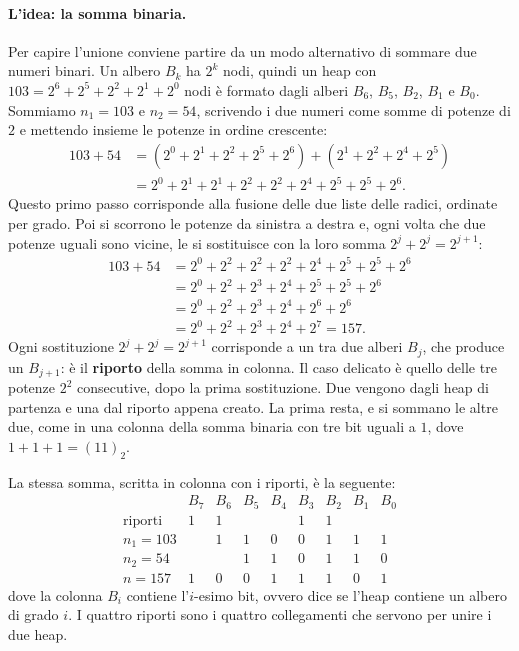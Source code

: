 \paragraph{L'idea: la somma binaria.}
Per capire l'unione conviene partire da un modo alternativo di sommare due numeri binari. Un albero $B_k$ ha $2^k$ nodi, quindi un heap con $103 = 2^6 + 2^5 + 2^2 + 2^1 + 2^0$ nodi è formato dagli alberi $B_6$, $B_5$, $B_2$, $B_1$ e $B_0$. Sommiamo $n_1 = 103$ e $n_2 = 54$, scrivendo i due numeri come somme di potenze di $2$ e mettendo insieme le potenze in ordine crescente:
\[
\begin{aligned}
103 + 54 &= (2^0 + 2^1 + 2^2 + 2^5 + 2^6) + (2^1 + 2^2 + 2^4 + 2^5) \\
&= 2^0 + 2^1 + 2^1 + 2^2 + 2^2 + 2^4 + 2^5 + 2^5 + 2^6.
\end{aligned}
\]
Questo primo passo corrisponde alla fusione delle due liste delle radici, ordinate per grado. Poi si scorrono le potenze da sinistra a destra e, ogni volta che due potenze uguali sono vicine, le si sostituisce con la loro somma $2^j + 2^j = 2^{j+1}$:
\[
\begin{aligned}
103 + 54 &= 2^0 + 2^2 + 2^2 + 2^2 + 2^4 + 2^5 + 2^5 + 2^6 \\
&= 2^0 + 2^2 + 2^3 + 2^4 + 2^5 + 2^5 + 2^6 \\
&= 2^0 + 2^2 + 2^3 + 2^4 + 2^6 + 2^6 \\
&= 2^0 + 2^2 + 2^3 + 2^4 + 2^7 = 157.
\end{aligned}
\]
Ogni sostituzione $2^j + 2^j = 2^{j+1}$ corrisponde a un \BinomialLink{} tra due alberi $B_j$, che produce un $B_{j+1}$: è il \textbf{riporto} della somma in colonna. Il caso delicato è quello delle tre potenze $2^2$ consecutive, dopo la prima sostituzione. Due vengono dagli heap di partenza e una dal riporto appena creato. La prima resta, e si sommano le altre due, come in una colonna della somma binaria con tre bit uguali a $1$, dove $1 + 1 + 1 = (11)_2$.

La stessa somma, scritta in colonna con i riporti, è la seguente:
\[
\begin{array}{rcccccccc}
 & B_7 & B_6 & B_5 & B_4 & B_3 & B_2 & B_1 & B_0 \\
\text{riporti} & 1 & 1 & & & 1 & 1 & & \\
n_1 = 103 & & 1 & 1 & 0 & 0 & 1 & 1 & 1 \\
n_2 = 54 & & & 1 & 1 & 0 & 1 & 1 & 0 \\
\hline
n = 157 & 1 & 0 & 0 & 1 & 1 & 1 & 0 & 1
\end{array}
\]
dove la colonna $B_i$ contiene l'$i$-esimo bit, ovvero dice se l'heap contiene un albero di grado $i$. I quattro riporti sono i quattro collegamenti che servono per unire i due heap.

